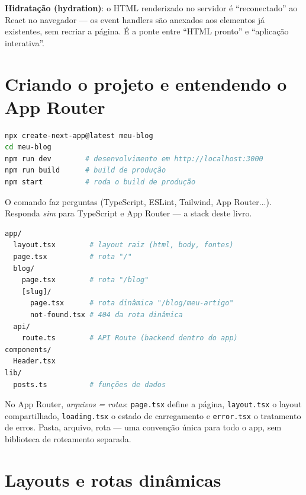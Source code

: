 \begin{caixaconceito}
\textbf{Hidratação (hydration)}: o HTML renderizado no servidor é
``reconectado'' ao React no navegador — os event handlers são anexados aos
elementos já existentes, sem recriar a página. É a ponte entre ``HTML pronto''
e ``aplicação interativa''.
\end{caixaconceito}

\section{Criando o projeto e entendendo o App Router}

\begin{lstlisting}[style=livro, language=Bash,
  caption={Criando um projeto Next.js.}, label={list:nextjs-create}]
npx create-next-app@latest meu-blog
cd meu-blog
npm run dev        # desenvolvimento em http://localhost:3000
npm run build      # build de produção
npm start          # roda o build de produção
\end{lstlisting}

O comando faz perguntas (TypeScript, ESLint, Tailwind, App Router...).
Responda \emph{sim} para TypeScript e App Router — a stack deste livro.

\begin{lstlisting}[style=livro, language=Bash,
  caption={Estrutura de pastas do App Router.}, label={list:nextjs-estrutura}]
app/
  layout.tsx        # layout raiz (html, body, fontes)
  page.tsx          # rota "/"
  blog/
    page.tsx        # rota "/blog"
    [slug]/
      page.tsx      # rota dinâmica "/blog/meu-artigo"
      not-found.tsx # 404 da rota dinâmica
  api/
    route.ts        # API Route (backend dentro do app)
components/
  Header.tsx
lib/
  posts.ts          # funções de dados
\end{lstlisting}

\begin{caixaconceito}
No App Router, \emph{arquivos = rotas}: \texttt{page.tsx} define a página,
\texttt{layout.tsx} o layout compartilhado, \texttt{loading.tsx} o estado de
carregamento e \texttt{error.tsx} o tratamento de erros. Pasta, arquivo, rota
— uma convenção única para todo o app, sem biblioteca de roteamento separada.
\end{caixaconceito}

\section{Layouts e rotas dinâmicas}

